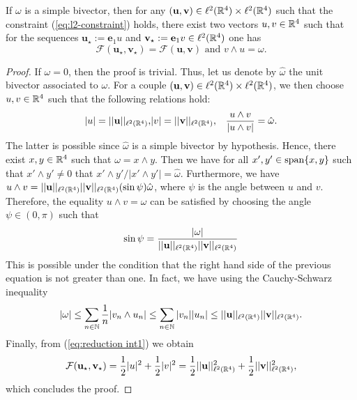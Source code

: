 \begin{proposition}
\label{prop:simple reduction}
If $\omega$ is a simple bivector, then for any $(\mathbf{u}, \mathbf{v}) \in \ell^2(\mathbb{R}^4) \times \ell^2(\mathbb{R}^4)$ such that the constraint (\ref{eq:l2-constraint}) holds, there exist two vectors $u,v \in \mathbb{R}^4$ such that for the sequences $\mathbf{u}_{\star} := \mathbf{e}_1 u$ and $\mathbf{v}_\star := \mathbf{e}_1 v \in \ell^2(\mathbb{R}^4)$ one has 
\begin{equation}
\mathcal{F}(\mathbf{u_{\star}}, \mathbf{v_{\star}}) = \mathcal{F}(\mathbf{u}, \mathbf{v}) \text{ and } v \wedge u = \omega.
\end{equation}
\end{proposition}

\begin{proof}
If $\omega = 0$, then the proof is trivial. Thus, let us denote by $\hat{\omega}$ the unit bivector associated to $\omega$. For a couple $(\mathbf{u}, \mathbf{v}) \in \ell^2(\mathbb{R}^4) \times \ell^2(\mathbb{R}^4)$, we then choose $u,v \in \mathbb{R}^4$ such that the following relations hold:
\begin{eqnarray}
\label{eq:reduction int1}
	|u| = ||\mathbf{u} ||_{\ell^2(\mathbb{R}^4)}, &  |v| = ||\mathbf{v} ||_{\ell^2(\mathbb{R}^4)} , & \frac{u \wedge v}{|u \wedge v|} = \hat{\omega}.
\end{eqnarray}
The latter is possible since $\hat{\omega}$ is a simple bivector by hypothesis. Hence, there exist $x, y \in \mathbb{R}^4$ such that $\omega = x \wedge y$. Then we have for all $x', y' \in \operatorname{span}\{x,y\}$ such that $x' \wedge y' \neq 0$ that $x' \wedge y'/|x' \wedge y'| = \hat{\omega}$. Furthermore, we have $u \wedge v = ||\mathbf{u}||_{\ell^2(\mathbb{R}^4)} ||\mathbf{v}||_{\ell^2(\mathbb{R}^4)} (\sin\psi)\hat{\omega}$, where $\psi$ is the angle between $u$ and $v$. Therefore, the equality $u \wedge v = \omega$ can be satisfied by choosing the angle $\psi \in (0, \pi)$ such that
\begin{equation}
 \sin \psi = \frac{|\omega|}{||\mathbf{u}||_{\ell^2(\mathbb{R}^4)} ||\mathbf{v} ||_{\ell^2(\mathbb{R}^4)}}
 \end{equation}
This is possible under the condition that the right hand side  of the previous equation is not greater than one. In fact, we have using the Cauchy-Schwarz inequality
\begin{equation}
|\omega| \leq \sum_{n \in \mathbb{N}} \frac{1}{n} |v_n \wedge u_n| \leq \sum_{n \in \mathbb{N}} |v_n| |u_n| \leq ||\mathbf{u} ||_{\ell^2(\mathbb{R}^4)} ||\mathbf{v} ||_{\ell^2(\mathbb{R}^4)}.
\end{equation}
Finally, from (\ref{eq:reduction int1}) we obtain
\begin{equation}
\mathcal{F}(\mathbf{u_\star}, \mathbf{v_{\star}}) = \frac{1}{2} |u|^2 + \frac{1}{2} |v|^2 = \frac{1}{2} ||\mathbf{u}||_{\ell^2(\mathbb{R}^4)}^2 + \frac{1}{2} ||\textbf{v}||_{\ell^2(\mathbb{R}^4)}^2,
\end{equation}
which concludes the proof.
\end{proof}

